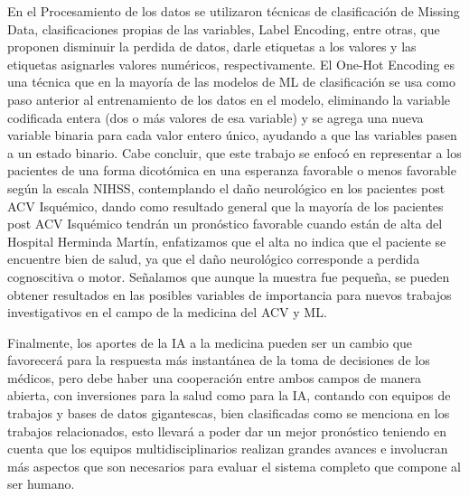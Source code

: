\par En el Procesamiento de los datos se utilizaron técnicas de clasificación de Missing Data, clasificaciones propias de las variables, Label Encoding, entre otras, que proponen disminuir la perdida de datos, darle etiquetas a los valores y las etiquetas asignarles valores numéricos, respectivamente.
El One-Hot Encoding es una técnica que en la mayoría de las modelos de ML de clasificación se usa como paso anterior al entrenamiento de los datos en el modelo, eliminando la variable codificada entera (dos o más valores de esa variable) y se agrega una nueva variable binaria para cada valor entero único, ayudando a que las variables pasen a un estado binario.
Cabe concluir, que este trabajo se enfocó en representar a los pacientes de una forma dicotómica en una esperanza favorable o menos favorable según la escala NIHSS, contemplando el daño neurológico en los pacientes post ACV Isquémico, dando como resultado general que la mayoría de los pacientes post ACV Isquémico tendrán un pronóstico favorable cuando están de alta del Hospital Herminda Martín, enfatizamos que el alta no indica que el paciente se encuentre bien de salud, ya que el daño neurológico corresponde a perdida cognoscitiva o motor. Señalamos que aunque la muestra fue pequeña, se pueden obtener resultados en las posibles variables de importancia para nuevos trabajos investigativos en el campo de la medicina del ACV y ML.\\

\par Finalmente, los aportes de la IA a la medicina pueden ser un cambio que favorecerá para la respuesta más instantánea de la toma de decisiones de los médicos, pero debe haber una cooperación entre ambos campos de manera abierta, con inversiones para la salud como para la IA, contando con equipos de trabajos y bases de datos gigantescas, bien clasificadas como se menciona en los trabajos relacionados, esto llevará a poder dar un mejor pronóstico teniendo en cuenta que los equipos multidisciplinarios realizan grandes avances e involucran más aspectos que son necesarios para evaluar el sistema completo que compone al ser humano. 
